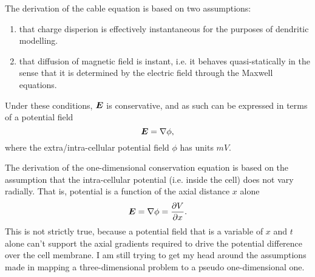 The derivation of the cable equation is based on two assumptions:
\begin{enumerate}
    \item that charge disperion is effectively instantaneous for the purposes of dendritic modelling.
    \item that diffusion of magnetic field is instant, i.e. it behaves quasi-statically in the sense that it is determined by the electric field through the Maxwell equations.
\end{enumerate}
Under these conditions, $\bm{E}$ is conservative, and as such can be expressed in terms of a potential field
\begin{equation}
    \bm{E} = \nabla \phi,
\end{equation}
where the extra/intra-cellular potential field $\phi$ has units $mV$.

The derivation of the one-dimensional conservation equation  is based on the assumption that the intra-cellular potential (i.e. inside the cell) does not vary radially.
That is, potential is a function of the axial distance $x$ alone
\begin{equation}
    \bm{E} = \nabla \phi = \frac{\partial{V}}{\partial{x}}.
\end{equation}
This is not strictly true, because a potential field that is a variable of $x$ and $t$ alone can't support the axial gradients required to drive the potential difference over the cell membrane.
I am still trying to get my head around the assumptions made in mapping a three-dimensional problem to a pseudo one-dimensional one.
